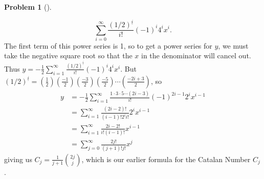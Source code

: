 \documentclass[10pt,]{book}
\theoremstyle{plain}
\theoremstyle{definition}
\newtheorem{activity}[project]{Problem}
\theoremstyle{definition}
\numberwithin{equation}{chapter}
\newcommand{\amp}{&}
\begin{document}
\begin{activity}[]
\begin{enumerate}[font=\bfseries,label=(\alph*),ref=\alph*]
\begin{equation*}
\sum_{i=0}^\infty \frac{(1/2)^{\underline{i}}}{i!}(-1)^i4^ix^i\text{.}
\end{equation*}
The first term of this power series is 1, so to get a power series for \(y\), we must take the negative square root so that the \(x\) in the denominator will cancel out. Thus \(y=-\frac{1}{2}\sum_{i=1}^\infty \frac{(1/2)^{\underline{i}}}{i!}(-1)^i4^ix^i\). But \((1/2)^{\underline{i}}=(\frac{1}{2})(\frac{-1}{2})(\frac{-3}{2})(\frac{-5}{2})\cdots (\frac{-2i+3}{2})\), so%
\begin{align*}
y \amp= -\frac{1}{2}\sum_{i=1}^\infty\frac{1\cdot3\cdot5\cdots(2i-3)}{i!}(-1)^{2i-1}2^ix^{i-1}\\
\amp=  \sum_{i=1}^\infty \frac{(2i-2)!}{(i-1)!2^{i}i!}2^ix^{i-1}\\
\amp=  \sum_{i=1}^\infty\frac{2i-2!}{i!(i-1)!}x^{i-1}\\
\amp= \sum_{j=0}^\infty\frac{2j!}{(j+1)!j!}x^j
\end{align*}
giving us \(C_j=\frac{1}{j+1}\binom{2j}{j}\), which is our earlier formula for the Catalan Number \(C_j\).%
\end{enumerate}
\end{activity}
\typeout{************************************************}
\typeout{************************************************}
\end{document}
